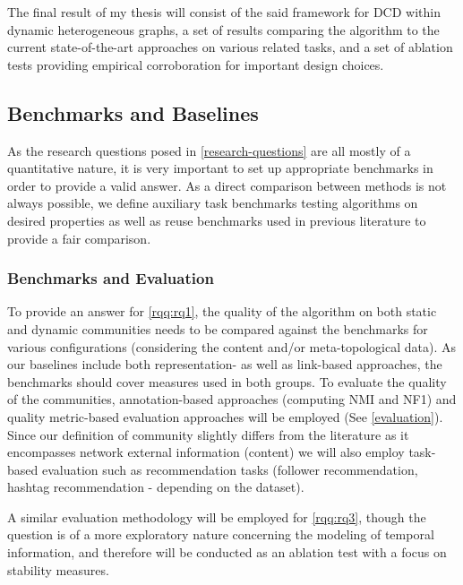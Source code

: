 \documentclass[
acmsmall,
nonacm,
screen,
acmthm]{../../scripts/pandoc/templates/acmart}
\begin{document}
The final result of my thesis will consist of the said framework for DCD
within dynamic heterogeneous graphs, a set of results comparing the
algorithm to the current state-of-the-art approaches on various related
tasks, and a set of ablation tests providing empirical corroboration for
important design choices.

\hypertarget{benchmarks-and-baselines}{%
\subsection{Benchmarks and Baselines}\label{benchmarks-and-baselines}}

As the research questions posed in \cref{research-questions} are all
mostly of a quantitative nature, it is very important to set up
appropriate benchmarks in order to provide a valid answer. As a direct
comparison between methods is not always possible, we define auxiliary
task benchmarks testing algorithms on desired properties as well as
reuse benchmarks used in previous literature to provide a fair
comparison.

\hypertarget{benchmarks-and-evaluation}{%
\subsubsection{Benchmarks and
Evaluation}\label{benchmarks-and-evaluation}}

To provide an answer for \cref{rqq:rq1}, the quality of the algorithm on
both static and dynamic communities needs to be compared against the
benchmarks for various configurations (considering the content and/or
meta-topological data). As our baselines include both representation- as
well as link-based approaches, the benchmarks should cover measures used
in both groups. To evaluate the quality of the communities,
annotation-based approaches (computing NMI and NF1) and quality
metric-based evaluation approaches will be employed (See
\ref{evaluation}). Since our definition of community slightly differs
from the literature as it encompasses network external information
(content) we will also employ task-based evaluation such as
recommendation tasks (follower recommendation, hashtag recommendation -
depending on the dataset).

A similar evaluation methodology will be employed for \cref{rqq:rq3},
though the question is of a more exploratory nature concerning the
modeling of temporal information, and therefore will be conducted as an
ablation test with a focus on stability measures.
\end{document}
